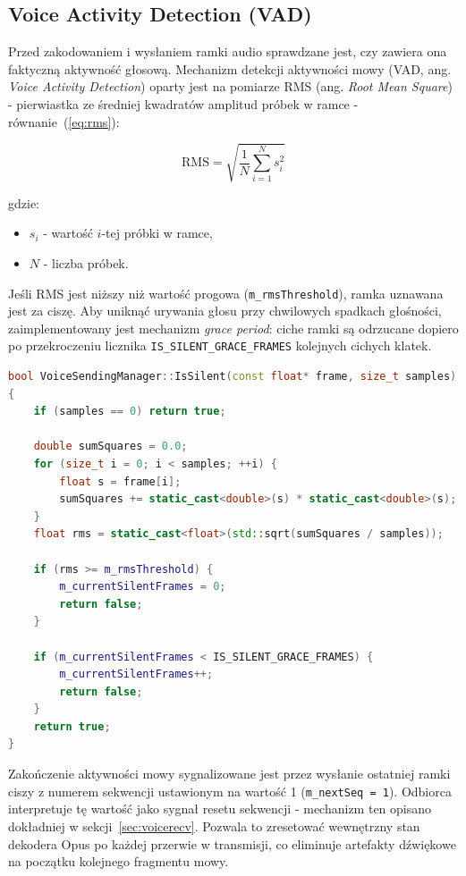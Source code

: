 \subsection*{Voice Activity Detection (VAD)}

Przed zakodowaniem i wysłaniem ramki audio sprawdzane jest, czy zawiera
ona faktyczną aktywność głosową. Mechanizm detekcji aktywności mowy (VAD,
ang. \textit{Voice Activity Detection}) oparty jest na pomiarze RMS
(ang. \textit{Root Mean Square}) - pierwiastka ze średniej kwadratów
amplitud próbek w ramce - równanie~(\ref{eq:rms}):

\begin{equation}
    \mathrm{RMS} = \sqrt{\frac{1}{N}\sum_{i=1}^{N} s_i^2}
    \label{eq:rms}
\end{equation}

\noindent gdzie: 
\begin{itemize}
	\item $s_i$ - wartość $i$-tej próbki w ramce,
	\item $N$ - liczba próbek.
\end{itemize}
Jeśli RMS jest niższy niż wartość progowa
(\texttt{m\_rmsThreshold}), ramka uznawana jest za ciszę.
Aby uniknąć urywania głosu przy chwilowych spadkach głośności,
zaimplementowany jest mechanizm \textit{grace period}: ciche ramki
są odrzucane dopiero po przekroczeniu licznika \texttt{IS\_SILENT\_GRACE\_FRAMES}
kolejnych cichych klatek.

\begin{lstlisting}[language=C++, caption={Implementacja VAD oparta na RMS (praca własna)}, label={lst:vad}]
bool VoiceSendingManager::IsSilent(const float* frame, size_t samples)
{
    if (samples == 0) return true;

    double sumSquares = 0.0;
    for (size_t i = 0; i < samples; ++i) {
        float s = frame[i];
        sumSquares += static_cast<double>(s) * static_cast<double>(s);
    }
    float rms = static_cast<float>(std::sqrt(sumSquares / samples));

    if (rms >= m_rmsThreshold) {
        m_currentSilentFrames = 0;
        return false;
    }

    if (m_currentSilentFrames < IS_SILENT_GRACE_FRAMES) {
        m_currentSilentFrames++;
        return false;
    }
    return true;
}
\end{lstlisting}

Zakończenie aktywności mowy sygnalizowane jest przez wysłanie ostatniej
ramki ciszy z numerem sekwencji ustawionym na wartość 1
(\texttt{m\_nextSeq = 1}). Odbiorca interpretuje tę wartość
jako sygnał resetu sekwencji - mechanizm ten opisano dokładniej
w sekcji~\ref{sec:voicerecv}. Pozwala to zresetować wewnętrzny stan
dekodera Opus po każdej przerwie w transmisji, co eliminuje artefakty
dźwiękowe na początku kolejnego fragmentu mowy.

